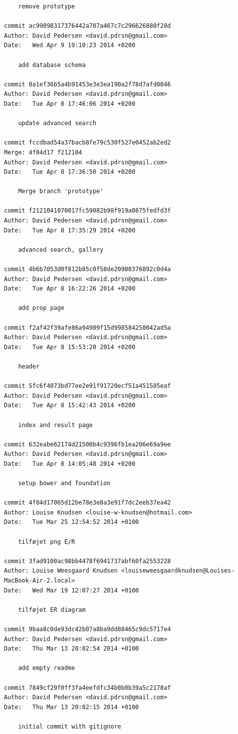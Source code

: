 \documentclass[12pt]{article}
\begin{document}
\begin{verbatim}
    remove prototype

commit ac99098317376442a707a467c7c296626880f28d
Author: David Pedersen <david.pdrsn@gmail.com>
Date:   Wed Apr 9 19:10:23 2014 +0200

    add database schema

commit 8a1ef36b5a4b91453e3e3ea190a2f78d7afd0046
Author: David Pedersen <david.pdrsn@gmail.com>
Date:   Tue Apr 8 17:46:06 2014 +0200

    update advanced search

commit fccdbad54a37bacb8fe79c530f527e0452ab2ed2
Merge: 4f04d17 f212104
Author: David Pedersen <david.pdrsn@gmail.com>
Date:   Tue Apr 8 17:36:50 2014 +0200

    Merge branch 'prototype'

commit f2121041070817fc59082b98f919a0875fedfd3f
Author: David Pedersen <david.pdrsn@gmail.com>
Date:   Tue Apr 8 17:35:29 2014 +0200

    advanced search, gallery

commit 4b6b7053d0f812b85c0f58de20908376892c0d4a
Author: David Pedersen <david.pdrsn@gmail.com>
Date:   Tue Apr 8 16:22:26 2014 +0200

    add prop page

commit f2af42f39afe86a94909f15d998584250042ad5a
Author: David Pedersen <david.pdrsn@gmail.com>
Date:   Tue Apr 8 15:53:20 2014 +0200

    header

commit 5fc6f4073bd77ee2e91f91720ecf51a451585eaf
Author: David Pedersen <david.pdrsn@gmail.com>
Date:   Tue Apr 8 15:42:43 2014 +0200

    index and result page

commit 632eabe62174d21500b4c9396fb1ea206e69a9ee
Author: David Pedersen <david.pdrsn@gmail.com>
Date:   Tue Apr 8 14:05:48 2014 +0200

    setup bower and foundation

commit 4f04d17065d12be78e3e8a3e91f7dc2eeb37ea42
Author: Louise Knudsen <louise-w-knudsen@hotmail.com>
Date:   Tue Mar 25 12:54:52 2014 +0100

    tilføjet png E/R

commit 3fad9100ac98bb4478f6941737abf60fa2553228
Author: Louise Weesgaard Knudsen <louiseweesgaardknudsen@Louises-MacBook-Air-2.local>
Date:   Wed Mar 19 12:07:27 2014 +0100

    tilføjet ER diagram

commit 9baa8c0de93dc42b07a8ba9dd88465c9dc5717e4
Author: David Pedersen <david.pdrsn@gmail.com>
Date:   Thu Mar 13 20:02:54 2014 +0100

    add empty readme

commit 7849cf29f0ff3fa4eefdfc34b0b0b39a5c2178af
Author: David Pedersen <david.pdrsn@gmail.com>
Date:   Thu Mar 13 20:02:15 2014 +0100

    initial commit with gitignore

\end{verbatim}
\end{document}
